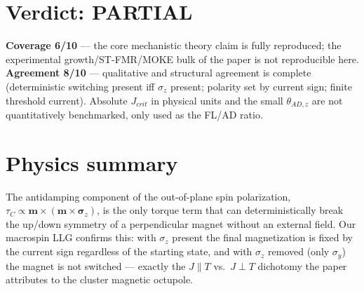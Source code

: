 \documentclass[11pt]{article}
\begin{document}
\section{Verdict: PARTIAL}
\textbf{Coverage 6/10} --- the core mechanistic theory claim is fully reproduced; the
experimental growth/ST-FMR/MOKE bulk of the paper is not reproducible here.
\textbf{Agreement 8/10} --- qualitative and structural agreement is complete
(deterministic switching present iff $\sigma_z$ present; polarity set by current sign;
finite threshold current). Absolute $J_{crit}$ in physical units and the small
$\theta_{AD,z}$ are not quantitatively benchmarked, only used as the FL/AD ratio.

\section{Physics summary}
The antidamping component of the out-of-plane spin polarization,
$\tau_C\propto\mathbf{m}\times(\mathbf{m}\times\boldsymbol{\sigma}_z)$, is the only torque
term that can deterministically break the up/down symmetry of a perpendicular magnet
without an external field. Our macrospin LLG confirms this: with $\sigma_z$ present the
final magnetization is fixed by the current sign regardless of the starting state, and with
$\sigma_z$ removed (only $\sigma_y$) the magnet is not switched --- exactly the
$J\parallel T$ vs.\ $J\perp T$ dichotomy the paper attributes to the cluster magnetic octupole.
\end{document}
